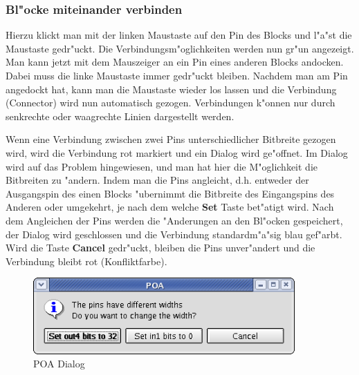 \documentclass[a4paper,titlepage,12pt,ngerman]{scrbook}
\begin{document}
\subsubsection{Bl"ocke miteinander verbinden}
Hierzu klickt man mit der linken Maustaste auf den Pin des Blocks und l"a"st die Maustaste gedr"uckt. Die Verbindungsm"oglichkeiten werden nun gr"un angezeigt. Man kann jetzt mit dem Mauszeiger an ein Pin eines anderen Blocks andocken. Dabei muss die linke Maustaste immer gedr"uckt bleiben. Nachdem man am Pin angedockt hat, kann man die Maustaste wieder los lassen und die Verbindung (Connector) wird nun automatisch gezogen. Verbindungen k"onnen nur durch senkrechte oder waagrechte Linien dargestellt werden.\par
Wenn eine Verbindung zwischen zwei Pins unterschiedlicher Bitbreite gezogen wird, wird die Verbindung rot markiert und ein Dialog wird ge"offnet. Im Dialog wird auf das Problem hingewiesen, und man hat hier die M"oglichkeit die Bitbreiten zu "andern. Indem man die Pins angleicht, d.h. entweder der Ausgangspin des einen Blocks "ubernimmt die Bitbreite des Eingangspins des Anderen oder umgekehrt, je nach dem welche {\bf Set} Taste bet"atigt wird. Nach dem Angleichen der Pins werden die "Anderungen an den Bl"ocken gespeichert, der Dialog wird geschlossen und die Verbindung standardm"a"sig blau gef"arbt.\newline
Wird die Taste {\bf Cancel} gedr"uckt, bleiben die Pins unver"andert und die Verbindung bleibt rot (Konfliktfarbe).

\begin{figure}[htbp]

\begin{center}

\includegraphics[width=10cm]{Pin}

\caption{POA Dialog}\label{test}

\end{center}

\end{figure}
\end{document}
